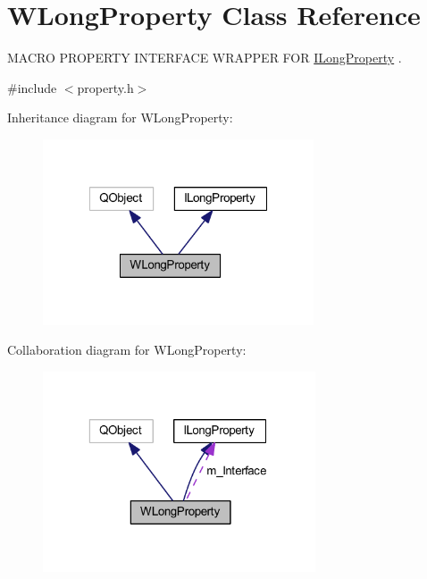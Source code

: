 \hypertarget{class_w_long_property}{\section{W\-Long\-Property Class Reference}
\label{class_w_long_property}
}


M\-A\-C\-R\-O P\-R\-O\-P\-E\-R\-T\-Y I\-N\-T\-E\-R\-F\-A\-C\-E W\-R\-A\-P\-P\-E\-R F\-O\-R \hyperlink{class_i_long_property}{I\-Long\-Property} .  




{\ttfamily \#include $<$property.\-h$>$}



Inheritance diagram for W\-Long\-Property\-:
\nopagebreak
\begin{figure}[H]
\begin{center}
\leavevmode
\includegraphics[width=227pt]{class_w_long_property__inherit__graph}
\end{center}
\end{figure}


Collaboration diagram for W\-Long\-Property\-:
\nopagebreak
\begin{figure}[H]
\begin{center}
\leavevmode
\includegraphics[width=229pt]{class_w_long_property__coll__graph}
\end{center}
\end{figure}
